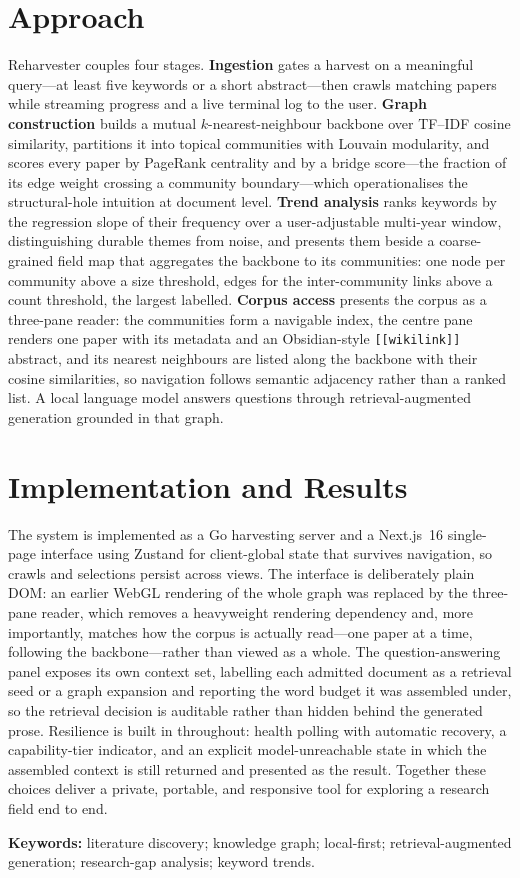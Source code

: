 \documentclass[11pt]{article}
\begin{document}
\section{Approach}
Reharvester couples four stages. \textbf{Ingestion} gates a harvest on a meaningful
query---at least five keywords or a short abstract---then crawls matching papers while
streaming progress and a live terminal log to the user. \textbf{Graph construction}
builds a mutual $k$-nearest-neighbour backbone over TF--IDF cosine similarity, partitions
it into topical communities with Louvain modularity, and scores every paper by PageRank
centrality and by a bridge score---the fraction of its edge weight crossing a community
boundary---which operationalises the structural-hole intuition at document level.
\textbf{Trend analysis} ranks keywords by the regression slope
of their frequency over a user-adjustable multi-year window, distinguishing durable
themes from noise, and presents them beside a coarse-grained field map that aggregates
the backbone to its communities: one node per community above a size threshold, edges
for the inter-community links above a count threshold, the largest labelled.
\textbf{Corpus access} presents the corpus as a three-pane reader:
the communities form a navigable index, the centre pane renders one paper with its
metadata and an Obsidian-style \texttt{[[wikilink]]} abstract, and its nearest
neighbours are listed along the backbone with their cosine similarities, so navigation
follows semantic adjacency rather than a ranked list. A local language model answers
questions through retrieval-augmented generation grounded in that graph.

\section{Implementation and Results}
The system is implemented as a Go harvesting server and a Next.js~16 single-page
interface using Zustand for client-global state that survives navigation, so crawls and
selections persist across views. The interface is deliberately plain DOM: an earlier
WebGL rendering of the whole graph was replaced by the three-pane reader, which removes
a heavyweight rendering dependency and, more importantly, matches how the corpus is
actually read---one paper at a time, following the backbone---rather than viewed as a
whole. The question-answering panel exposes its own context set, labelling each admitted
document as a retrieval seed or a graph expansion and reporting the word budget it was
assembled under, so the retrieval decision is auditable rather than hidden behind the
generated prose. Resilience is built in throughout: health polling with automatic
recovery, a capability-tier indicator, and an explicit model-unreachable state in which
the assembled context is still returned and presented as the result. Together these
choices deliver a private, portable, and responsive tool for exploring a research field
end to end.

\vspace{1em}
\noindent\textbf{Keywords:} literature discovery; knowledge graph; local-first;
retrieval-augmented generation; research-gap analysis; keyword trends.
\end{document}
